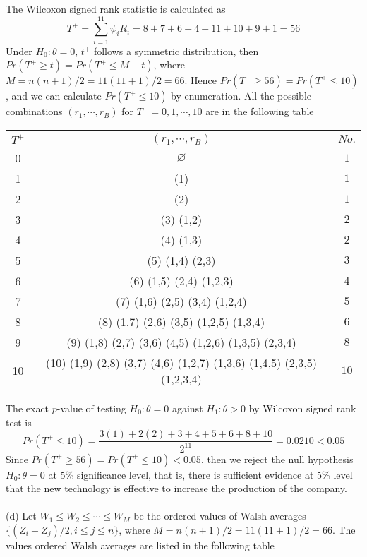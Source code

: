 \documentclass[12pt,a4paper]{article}
\begin{document}
The Wilcoxon signed rank statistic is calculated as
$$T^{+}=\sum_{i=1}^{11}\psi_{i}R_{i}=8+7+6+4+11+10+9+1=56$$
Under $H_{0}:\theta =0$, $t^{+}$ follows a symmetric distribution, then $Pr(T^{+}\geqslant t)=Pr(T^{+}\leqslant M-t)$, where $M=n(n+1)/2=11(11+1)/2=66$.
Hence $Pr(T^{+}\geqslant 56)=Pr(T^{+}\leqslant 10)$, and we can calculate $Pr(T^{+}\leqslant 10)$ by enumeration. All the possible combinations $(r_{1},\cdots,r_{B})$ for $T^{+}=0,1,\cdots,10$ are in the following table
\begin{center}
	\begin{tabular}{ |c|c|c| }
		\hline
		$T^{+}$ & $(r_{1},\cdots,r_{B})$ & $No.$ \\ 
		\hline
		0 & $\varnothing$ & $1$ \\ 
		1 & (1) & $1$ \\ 
		2 & (2) & $1$ \\ 
		3 & (3) (1,2) & $2$ \\
		4 & (4) (1,3) & $2$ \\
		5 & (5) (1,4) (2,3) & $3$ \\
		6 & (6) (1,5) (2,4) (1,2,3) & $4$ \\
		7 & (7) (1,6) (2,5) (3,4) (1,2,4) & $5$ \\
		8 & (8) (1,7) (2,6) (3,5) (1,2,5) (1,3,4) & $6$ \\
		9 & (9) (1,8) (2,7) (3,6) (4,5) (1,2,6) (1,3,5) (2,3,4) & $8$ \\
		10 & (10) (1,9) (2,8) (3,7) (4,6) (1,2,7) (1,3,6) (1,4,5) (2,3,5) (1,2,3,4) & $10$ \\
		\hline
	\end{tabular}
\end{center}
The exact $p$-value of testing $H_{0}:\theta =0$ against $H_{1}:\theta >0$ by Wilcoxon signed rank test is
$$Pr(T^{+}\leqslant 10)=\dfrac{3(1)+2(2)+3+4+5+6+8+10}{2^{11}}=0.0210<0.05$$
Since $Pr(T^{+}\geqslant 56)=Pr(T^{+}\leqslant 10)<0.05$, then we reject the null hypothesis $H_{0}:\theta =0$ at 5\% significance level, that is, there is sufficient evidence at 5\% level that the new technology is effective to increase the production of the company.\\
~\\
(d) Let $W_{1}\leqslant W_{2}\leqslant \cdots \leqslant W_{M}$ be the ordered values of Walsh averages  $\{(Z_{i}+Z_{j})/2,i\leqslant j\leqslant n\}$, where $M=n(n+1)/2=11(11+1)/2=66$. The values ordered Walsh averages are listed in the following table
\end{document}
